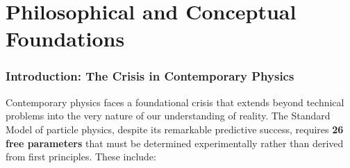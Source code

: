 \documentclass[11pt, a4paper]{article}
\theoremstyle{remark}
\begin{document}
\begin{abstract}
This comprehensive documentation presents the complete scientific record of the \textbf{Fractal Information Nadsoliton (FIN) Theory}, a unified framework proposing that reality emerges from a self-organizing information network at the Planck scale. The theory originates from a profound philosophical insight: that \textbf{Information is the fundamental substance of reality}, consistent with the ancient wisdom that ``In the beginning was the Word'' (Logos). Through over 1160 rigorous numerical studies (QW-series), we have systematically verified this framework, discovering that:
\begin{itemize}
    \item Particle masses follow a universal topological formula: $M(Q) = M_{top} \cdot 4^{-\gamma Q/4}$ with $\gamma \approx 1.52$
    \item The discrete topological charges $Q$ correlate with Fibonacci sequence sums, suggesting particles are \textbf{resonant Torus Knots}
    \item The mass scaling exponent is \textbf{scale-invariant} (running $\approx -0.007$), confirming fractal geometry
    \item Forces emerge as topological gradients with gravity following $1/r^{2.26}$ from pure geometry
\end{itemize}
This document provides \textbf{full derivations}, \textbf{calculation steps}, and \textbf{explicit verification results}, distinguishing between first-principles derivations and phenomenological fits. All research is traceable through QW study numbers.
\end{abstract}

\tableofcontents
\newpage

\part{Philosophical and Conceptual Foundations}

\section{Introduction: The Crisis in Contemporary Physics}

Contemporary physics faces a foundational crisis that extends beyond technical problems into the very nature of our understanding of reality. The Standard Model of particle physics, despite its remarkable predictive success, requires \textbf{26 free parameters} that must be determined experimentally rather than derived from first principles. These include:
\end{document}
